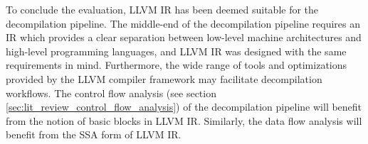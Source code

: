 To conclude the evaluation, LLVM IR has been deemed suitable for the decompilation pipeline. The middle-end of the decompilation pipeline requires an IR which provides a clear separation between low-level machine architectures and high-level programming languages, and LLVM IR was designed with the same requirements in mind. Furthermore, the wide range of tools and optimizations provided by the LLVM compiler framework may facilitate decompilation workflows. The control flow analysis (see section \ref{sec:lit_review_control_flow_analysis}) of the decompilation pipeline will benefit from the notion of basic blocks in LLVM IR. Similarly, the data flow analysis will benefit from the SSA form of LLVM IR.
